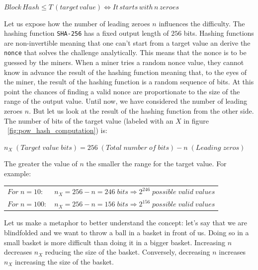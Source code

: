 \documentclass{scrbook}
\begin{document}
\begin{center}
    $Block \, Hash \leq T \, (target \, value) \Leftrightarrow It \, starts \, with \, n \, zeroes$
\end{center}

Let us expose how the number of leading zeroes $n$ influences the difficulty. The hashing function \texttt{SHA-256} has a fixed output length of $256$ bits. Hashing functions are non-invertible meaning that one can't start from a target value an derive the \texttt{nonce} that solves the challenge analytically. This means that the nonce is to be guessed by the miners. When a miner tries a random nonce value, they cannot know in advance the result of the hashing function meaning that, to the eyes of the miner, the result of the hashing function is a random sequence of bits. At this point the chances of finding a valid nonce are proportionate to the size of the range of the output value. Until now, we have considered the number of leading zeroes $n$. But let us look at the result of the hashing function from the other side. The number of bits of the target value (labeled with an $X$ in figure ~\ref{fig:pow_hash_computation}) is:

\begin{center}
    $n_X \; (Target \; value \; bits) = 256 \; (Total \; number \; of \; bits) - n \; (Leading \; zeros)$
\end{center}

\newpage

The greater the value of $n$ the smaller the range for the target value. For example:

\begin{table}[htbp]
\centering
    \begin{tabular}{l l}
        $For \; n=10:$ & $n_X = 256 - n = 246 \; bits \Rightarrow 2^{246} \; possible \; valid \; values$ \\
        $For \; n=100:$ & $n_X = 256 - n = 156 \; bits \Rightarrow 2^{156} \; possible \; valid \; values$ \\
    \end{tabular}
\end{table}

Let us make a metaphor to better understand the concept: let's say that we are blindfolded and we want to throw a ball in a basket in front of us. Doing so in a small basket is more difficult than doing it in a bigger basket. Increasing $n$ decreases $n_X$ reducing the size of the basket. Conversely, decreasing $n$ increases $n_X$ increasing the size of the basket. \\
\end{document}
